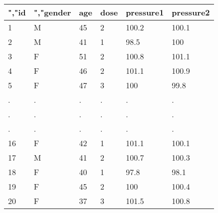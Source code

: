 \documentclass[preview]{standalone}
\begin{document}
\centering \begin{tabular}{llllll}
\hline
","id & ","gender & age & dose & pressure1 & pressure2 \\\hline
1 & M & 45 & 2 & 100.2 & 100.1 \\
2 & M & 41 & 1 & 98.5 & 100 \\
3 & F & 51 & 2 & 100.8 & 101.1 \\
4 & F & 46 & 2 & 101.1 & 100.9 \\
5 & F & 47 & 3 & 100 & 99.8 \\
. & . & . & . & . & . \\
. & . & . & . & . & . \\
. & . & . & . & . & . \\
16 & F & 42 & 1 & 101.1 & 100.1 \\
17 & M & 41 & 2 & 100.7 & 100.3 \\
18 & F & 40 & 1 & 97.8 & 98.1 \\
19 & F & 45 & 2 & 100 & 100.4 \\
20 & F & 37 & 3 & 101.5 & 100.8 \\
\hline
\end{tabular}
\end{document}
